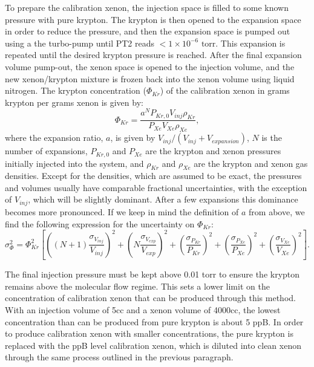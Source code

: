 \documentclass[12pt]{article}
\begin{document}
To prepare the calibration xenon, the injection space is filled to some known pressure with pure krypton. The krypton is then opened to the expansion space in order to reduce the pressure, and then the expansion space is pumped out using a the turbo-pump until PT2 reads $<1\times10^{-6} \textrm{ torr}$. This expansion is repeated until the desired krypton pressure is reached. After the final expansion volume pump-out, the xenon space is opened to the injection volume, and the new xenon/krypton mixture is frozen back into the xenon volume using liquid nitrogen. The krypton concentration ($\Phi_{Kr}$) of the calibration xenon in grams krypton per grams xenon is given by:
\begin{equation}
\Phi_{Kr} = \frac{a^{N}P_{Kr,0}V_{inj}\rho_{Kr} }{P_{Xe}V_{Xe}\rho_{Xe}},
\end{equation}
where the expansion ratio, $a$, is given by $V_{inj}/(V_{inj}+V_{expansion})$, $N$ is the number of expansions, $P_{Kr,0}$ and $P_{Xe}$ are the krypton and xenon pressures initially injected into the system, and $\rho_{Kr}$ and $\rho_{Xe}$ are the krypton and xenon gas densities. Except for the densities, which are assumed to be exact, the pressures and volumes usually have comparable fractional uncertainties, with the exception of $V_{inj}$, which will be slightly dominant. After a few expansions this dominance becomes more pronounced. If we keep in mind the definition of $a$ from above, we find the following expression for the uncertainty on $\Phi_{Kr}$:
\begin{equation}
\sigma_{\Phi}^{2} = \Phi_{Kr}^2\left[  \left((N+1)\frac{\sigma_{V_{inj}}}{V_{inj}}\right)^2 + \left(N\frac{\sigma_{V_{exp}}}{V_{exp}}\right)^2  + \left(\frac{\sigma_{P_{Kr}}}{P_{Kr}}\right)^2   + \left(\frac{\sigma_{P_{Xe}}}{P_{Xe}}\right)^2   + \left(\frac{\sigma_{V_{Xe}}}{V_{Xe}}\right)^2  \right].
\end{equation}

The final injection pressure must be kept above 0.01 torr to ensure the krypton remains above the molecular flow regime. This sets a lower limit on the concentration of calibration xenon that can be produced through this method. With an injection volume of 5cc and a xenon volume of 4000cc, the lowest concentration than can be produced from pure krypton is about 5 ppB. In order to produce calibration xenon with smaller concentrations, the pure krypton is replaced with the ppB level calibration xenon, which is diluted into clean xenon through the same process outlined in the previous paragraph.
\end{document}
